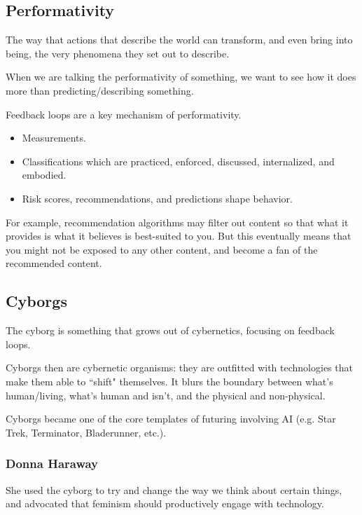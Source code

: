 \documentclass[openany]{book}
\begin{document}
\subsection{Performativity}
\begin{defn}
	The way that actions that describe the world can transform, and even bring into being, the very phenomena they set out to describe.
\end{defn}

When we are talking the performativity of something, we want to see how it does more than predicting/describing something.

Feedback loops are a key mechanism of performativity.
\begin{itemize}
	\item Measurements.
	\item Classifications which are practiced, enforced, discussed, internalized, and embodied.
	\item Risk scores, recommendations, and predictions shape behavior.
\end{itemize}

\begin{example}
	For example, recommendation algorithms may filter out content so that what it provides is what it believes is best-suited to you. But this eventually means that you might not be exposed to any other content, and become a fan of the recommended content.
\end{example}

\subsection{Cyborgs}
The cyborg is something that grows out of cybernetics, focusing on feedback loops.

Cyborgs then are cybernetic organisms: they are outfitted with technologies that make them able to ``shift" themselves. It blurs the boundary between what's human/living, what's human and isn't, and the physical and non-physical.

Cyborgs became one of the core templates of futuring involving AI (e.g. Star Trek, Terminator, Bladerunner, etc.).

\subsubsection{Donna Haraway}
She used the cyborg to try and change the way we think about certain things, and advocated that feminism should productively engage with technology.
\end{document}
